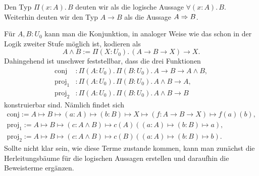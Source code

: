 Den Typ $\Pi(x\colon A).\, B$ deuten wir als die logische Aussage
$\forall (x\colon A).\, B$. Weiterhin deuten wir den Typ $A\to B$ als die
Aussage $A\Rightarrow B$.

Für $A,B\colon U_0$ kann man die Konjunktion, in
analoger Weise wie das schon in der Logik zweiter Stufe möglich ist, kodieren als
\[A\land B := \Pi(X\colon U_0).\, (A\to B\to X)\to X.\]
Dahingehend ist unschwer feststellbar, dass die drei Funktionen
\begin{align*}
\mathrm{conj}&\colon \Pi(A\colon U_0).\,\Pi(B\colon U_0).\,A\to B\to A\land B,\\
\mathrm{proj}_1&\colon \Pi(A\colon U_0).\,\Pi(B\colon U_0).\, A\land B\to A,\\
\mathrm{proj}_2&\colon \Pi(A\colon U_0).\,\Pi(B\colon U_0).\, A\land B\to B
\end{align*}
konstruierbar sind. Nämlich findet sich
\begin{gather*}
\mathrm{conj} := A\mapsto B\mapsto (a\colon A)\mapsto (b\colon B)\mapsto X\mapsto (f\colon A\to B\to X)\mapsto f(a)(b),\\
\mathrm{proj}_1 := A\mapsto B\mapsto (c\colon A\land B)\mapsto c(A)((a\colon A)\mapsto (b\colon B)\mapsto a),\\
\mathrm{proj}_2 := A\mapsto B\mapsto (c\colon A\land B)\mapsto c(B)((a\colon A)\mapsto (b\colon B)\mapsto b).
\end{gather*}
Sollte nicht klar sein, wie diese Terme zustande kommen, kann man zunächst
die Herleitungsbäume für die logischen Aussagen erstellen und daraufhin
die Beweisterme ergänzen.
